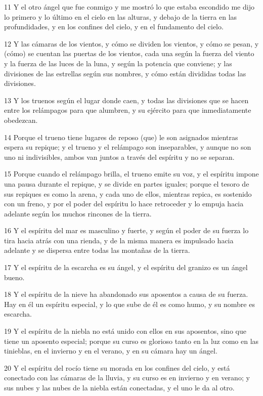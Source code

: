 \par 11 Y el otro ángel que fue conmigo y me mostró lo que estaba escondido me dijo lo primero y lo último en el cielo en las alturas, y debajo de la tierra en las profundidades, y en los confines del cielo, y en el fundamento del cielo.
\par 12 Y las cámaras de los vientos, y cómo se dividen los vientos, y cómo se pesan, y (cómo) se cuentan las puertas de los vientos, cada una según la fuerza del viento y la fuerza de las luces de la luna, y según la potencia que conviene; y las divisiones de las estrellas según sus nombres, y cómo están divididas todas las divisiones.
\par 13 Y los truenos según el lugar donde caen, y todas las divisiones que se hacen entre los relámpagos para que alumbren, y su ejército para que inmediatamente obedezcan.
\par 14 Porque el trueno tiene lugares de reposo (que) le son asignados mientras espera su repique; y el trueno y el relámpago son inseparables, y aunque no son uno ni indivisibles, ambos van juntos a través del espíritu y no se separan.
\par 15 Porque cuando el relámpago brilla, el trueno emite su voz, y el espíritu impone una pausa durante el repique, y se divide en partes iguales; porque el tesoro de sus repiques es como la arena, y cada uno de ellos, mientras repica, es sostenido con un freno, y por el poder del espíritu lo hace retroceder y lo empuja hacia adelante según los muchos rincones de la tierra.
\par 16 Y el espíritu del mar es masculino y fuerte, y según el poder de su fuerza lo tira hacia atrás con una rienda, y de la misma manera es impulsado hacia adelante y se dispersa entre todas las montañas de la tierra.
\par 17 Y el espíritu de la escarcha es su ángel, y el espíritu del granizo es un ángel bueno.
\par 18 Y el espíritu de la nieve ha abandonado sus aposentos a causa de su fuerza. Hay en él un espíritu especial, y lo que sube de él es como humo, y su nombre es escarcha.
\par 19 Y el espíritu de la niebla no está unido con ellos en sus aposentos, sino que tiene un aposento especial; porque su curso es glorioso tanto en la luz como en las tinieblas, en el invierno y en el verano, y en su cámara hay un ángel.
\par 20 Y el espíritu del rocío tiene su morada en los confines del cielo, y está conectado con las cámaras de la lluvia, y su curso es en invierno y en verano; y sus nubes y las nubes de la niebla están conectadas, y el uno le da al otro.
